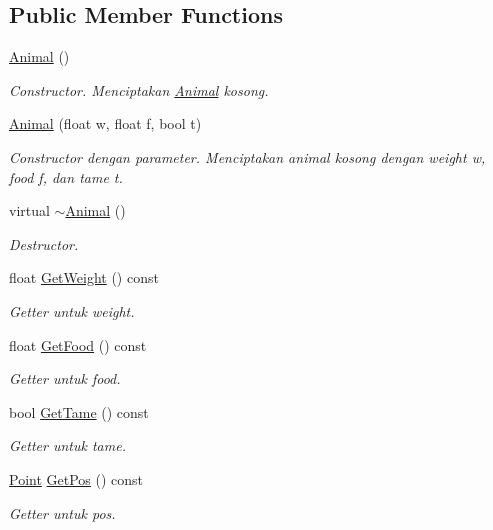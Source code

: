 \subsection*{Public Member Functions}
\begin{DoxyCompactItemize}
\item 
\hyperlink{classAnimal_a1e726a49ec952443190ac62dad22353c}{Animal} ()
\begin{DoxyCompactList}\small\item\em Constructor. Menciptakan \hyperlink{classAnimal}{Animal} kosong. \end{DoxyCompactList}\item 
\hyperlink{classAnimal_acc6020247b7d154583137a89c06971be}{Animal} (float w, float f, bool t)
\begin{DoxyCompactList}\small\item\em Constructor dengan parameter. Menciptakan animal kosong dengan weight w, food f, dan tame t. \end{DoxyCompactList}\item 
virtual \hyperlink{classAnimal_a16d8b7f94611cc65f5cdb58cc105527b}{$\sim$\+Animal} ()
\begin{DoxyCompactList}\small\item\em Destructor. \end{DoxyCompactList}\item 
float \hyperlink{classAnimal_a84b2804414e0c5113a4fe1ca03fc3fff}{Get\+Weight} () const 
\begin{DoxyCompactList}\small\item\em Getter untuk weight. \end{DoxyCompactList}\item 
float \hyperlink{classAnimal_a284817c8f57078ebce4fd1f17d824223}{Get\+Food} () const 
\begin{DoxyCompactList}\small\item\em Getter untuk food. \end{DoxyCompactList}\item 
bool \hyperlink{classAnimal_a2c4de7b5eb65afd3208306d85b595560}{Get\+Tame} () const 
\begin{DoxyCompactList}\small\item\em Getter untuk tame. \end{DoxyCompactList}\item 
\hyperlink{classPoint}{Point} \hyperlink{classAnimal_a183e4addbbccbe06a77e57bc8893cec1}{Get\+Pos} () const 
\begin{DoxyCompactList}\small\item\em Getter untuk pos. \end{DoxyCompactList}\item 

\end{DoxyCompactItemize}
